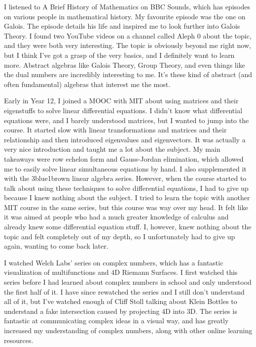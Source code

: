 \documentclass[a4paper, 12pt]{article}
\newenvironment{personalstatement}{\directlua{startPersonalStatement()}}{\directlua{stopPersonalStatement()}}
\begin{document}
\begin{personalstatement}
I listened to A Brief History of Mathematics on BBC Sounds, which has episodes on various people in mathematical history. My favourite episode was the one on Galois. The episode details his life and inspired me to look further into Galois Theory. I found two YouTube videos on a channel called Aleph 0 about the topic, and they were both very interesting. The topic is obviously beyond me right now, but I think I've got a grasp of the very basics, and I definitely want to learn more. Abstract algebras like Galois Theory, Group Theory, and even things like the dual numbers are incredibly interesting to me. It's these kind of abstract (and often fundamental) algebras that interest me the most.

Early in Year 12, I joined a MOOC with MIT about using matrices and their eigenstuffs to solve linear differential equations. I didn't know what differential equations were, and I barely understood matrices, but I wanted to jump into the course. It started slow with linear transformations and matrices and their relationship and then introduced eigenvalues and eigenvectors. It was actually a very nice introduction and taught me a lot about the subject. My main takeaways were row echelon form and Gauss-Jordan elimination, which allowed me to easily solve linear simultaneous equations by hand. I also supplemented it with the 3blue1brown linear algebra series. However, when the course started to talk about using these techniques to solve differential equations, I had to give up because I knew nothing about the subject. I tried to learn the topic with another MIT course in the same series, but this course was way over my head. It felt like it was aimed at people who had a much greater knowledge of calculus and already knew some differential equation stuff. I, however, knew nothing about the topic and felt completely out of my depth, so I unfortunately had to give up again, wanting to come back later.

I watched Welch Labs' series on complex numbers, which has a fantastic visualization of multifunctions and 4D Riemann Surfaces. I first watched this series before I had learned about complex numbers in school and only understood the first half of it. I have since rewatched the series and I still don't understand all of it, but I've watched enough of Cliff Stoll talking about Klein Bottles to understand a fake intersection caused by projecting 4D into 3D. The series is fantastic at communicating complex ideas in a visual way, and has greatly increased my understanding of complex numbers, along with other online learning resources.


\end{personalstatement}
\end{document}
